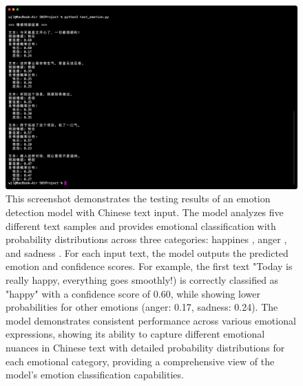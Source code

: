 \documentclass[journal]{IEEEtran}
\begin{document}
\begin{figure}[htb]
    \centering
    \includegraphics[width=\linewidth]{figures/figure_2.jpg}
    \caption{
    This screenshot demonstrates the testing results of an emotion detection model  with Chinese text input. The model analyzes five different text samples and provides emotional classification with probability distributions across three categories: happines , anger , and sadness . For each input text, the model outputs the predicted emotion and confidence scores. For example, the first text "Today is really happy, everything goes smoothly!) is correctly classified as "happy" with a confidence score of 0.60, while showing lower probabilities for other emotions (anger: 0.17, sadness: 0.24). The model demonstrates consistent performance across various emotional expressions, showing its ability to capture different emotional nuances in Chinese text with detailed probability distributions for each emotional category, providing a comprehensive view of the model's emotion classification capabilities.}
    \label{fig:my_label}
\end{figure}
\end{document}
